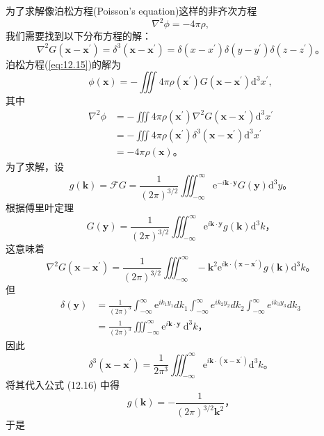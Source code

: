 为了求解像泊松方程(Poisson's
equation)这样的非齐次方程
\begin{equation}\label{eq:12.15} 
 \nabla^{2} \phi=-4 \pi \rho, 
 \end{equation}
我们需要找到以下分布方程的解：
\begin{equation}\label{eq:12.16} 
 \nabla^{2} G\left(\mathbf{x}-\mathbf{x}^{\prime}\right)=\delta^{3}\left(\mathbf{x}-\mathbf{x}^{\prime}\right)=\delta\left(x-x^{\prime}\right) \delta\left(y-y^{\prime}\right) \delta\left(z-z^{\prime}\right)。 
 \end{equation}
泊松方程(\ref{eq:12.15})的解为
 $$
\phi(\mathbf{x})=-\iiint 4 \pi \rho\left(\mathbf{x}^{\prime}\right) G\left(\mathbf{x}-\mathbf{x}^{\prime}\right) \mathrm{d}^{3} x^{\prime},
$$
其中
 $$
\begin{aligned}
\nabla^{2} \phi & =-\iiint 4 \pi \rho\left(\mathbf{x}^{\prime}\right) \nabla^{2} G\left(\mathbf{x}-\mathbf{x}^{\prime}\right) \mathrm{d}^{3} x^{\prime} \\
& =-\iiint 4 \pi \rho\left(\mathbf{x}^{\prime}\right) \delta^{3}\left(\mathbf{x}-\mathbf{x}^{\prime}\right) \mathrm{d}^{3} x^{\prime} \\
& =-4 \pi \rho(\mathbf{x})。
\end{aligned}
$$
为了求解，设
 $$
g(\mathbf{k})=\mathcal{F} G=\frac{1}{(2 \pi)^{3 / 2}} \iiint_{-\infty}^{\infty} \mathrm{e}^{-i \mathbf{k} \cdot \mathbf{y}} G(\mathbf{y}) \mathrm{d}^{3} y。
$$
根据傅里叶定理
 $$
G(\mathbf{y})=\frac{1}{(2 \pi)^{3 / 2}} \iiint_{-\infty}^{\infty} \mathrm{e}^{i \mathbf{k} \cdot \mathbf{y}} g(\mathbf{k}) \mathrm{d}^{3} k，
$$
这意味着
 $$
\nabla^{2} G\left(\mathbf{x}-\mathbf{x}^{\prime}\right)=\frac{1}{(2 \pi)^{3 / 2}} \iiint_{-\infty}^{\infty}-\mathbf{k}^{2} \mathrm{e}^{i \mathbf{k} \cdot \left(\mathbf{x}-\mathbf{x}^{\prime}\right)} g(\mathbf{k}) \mathrm{d}^{3} k。
$$
但
 $$
\begin{aligned}
\delta(\mathbf{y}) & =\frac{1}{(2 \pi)^{3}} \int_{-\infty}^{\infty} \mathrm{e}^{i k_{1} y_{1}} d k_{1} \int_{-\infty}^{\infty} e^{i k_{2} y_{2}} d k_{2} \int_{-\infty}^{\infty} e^{i k_{3} y_{3}} d k_{3} \\
& =\frac{1}{(2 \pi)^{3}} \iiint_{-\infty}^{\infty} \mathrm{e}^{i \mathbf{k} \cdot \mathbf{y}} \mathrm{~d}^{3} k，
\end{aligned}
$$
因此
 $$
\delta^{3}\left(\mathbf{x}-\mathbf{x}^{\prime}\right)=\frac{1}{2 \pi^{3}} \iiint_{-\infty}^{\infty} \mathrm{e}^{i \mathbf{k} \cdot\left(\mathbf{x}-\mathbf{x}^{\prime}\right)} \mathrm{d}^{3} k。
$$
将其代入公式 (12.16) 中得
 $$
g(\mathbf{k})=-\frac{1}{(2 \pi)^{3 / 2} \mathbf{k}^{2}}，
$$
于是

